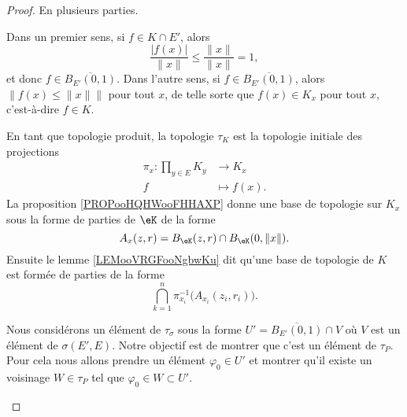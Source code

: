 \begin{proof}
	En plusieurs parties.
	\begin{subproof}
		\spitem[\( K\cap E'=\overline{B_{E'}(0,1)}\)]
		Dans un premier sens, si \( f\in K\cap E'\), alors
		\begin{equation}
			\frac{ | f(x) | }{ \| x \| }\leq \frac{ \| x \| }{ \| x \| }=1,
		\end{equation}
		et donc \( f\in \overline{B_{E'}(0,1)}\). Dans l'autre sens, si \( f\in\overline{B_{E'}(0,1)}\), alors \( \| f(x)\leq \| x \| \|\) pour tout \( x\), de telle sorte que \( f(x)\in K_x\) pour tout \( x\), c'est-à-dire \( f\in K\).

				\label{SPITEMooTIKWooTQzsGk}
		En tant que topologie produit, la topologie \( \tau_K\) est la topologie initiale des projections
		\begin{equation}
			\begin{aligned}
				\pi_x\colon \prod_{y\in E}K_y & \to K_x       \\
				f                             & \mapsto f(x).
			\end{aligned}
		\end{equation}
		La proposition \ref{PROPooHQHWooFHHAXP} donne une base de topologie sur \( K_x\) sous la forme de parties de \( \eK\) de la forme
		\begin{equation}
			A_x(z,r)=B_{\eK}(z,r)\cap B_{\eK}(0,\| x \|).
		\end{equation}
		Ensuite le lemme \ref{LEMooVRGFooNgbwKu} dit qu'une base de topologie de \( K\) est formée de parties de la forme
		\begin{equation}
			\bigcap_{k=1}^n\pi_{x_i}^{-1}\big( A_{x_i}(z_i,r_i) \big).
		\end{equation}

		Nous considérons un élément de \( \tau_{\sigma}\) sous la forme \( U'=\overline{B_{E'}(0,1)}\cap V\) où \( V\) est un élément de \( \sigma(E',E)\). Notre objectif est de montrer que c'est un élément de \( \tau_P\). Pour cela nous allons prendre un élément \( \varphi_0\in U'\) et montrer qu'il existe un voisinage \( W\in \tau_P\) tel que \( \varphi_0\in W\subset U'\).


\end{subproof}
\end{proof}
